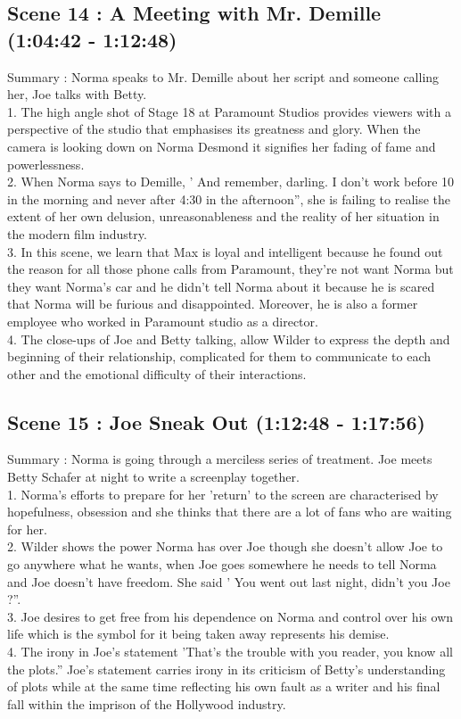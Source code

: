 \documentclass[a4paper]{article}
\begin{document}
\subsection{Scene 14 : A Meeting with Mr. Demille (1:04:42 - 1:12:48)}
Summary : Norma speaks to Mr. Demille about her script and someone calling her, Joe talks
with Betty.\\
1. The high angle shot of Stage 18 at Paramount Studios provides viewers with a
perspective of the studio that emphasises its greatness and glory. When the camera
is looking down on Norma Desmond it signifies her fading of fame and
powerlessness.\\
2. When Norma says to Demille, ' And remember, darling. I don’t work before 10 in the
morning and never after 4:30 in the afternoon”, she is failing to realise the extent of
her own delusion, unreasonableness and the reality of her situation in the modern
film industry.\\
3. In this scene, we learn that Max is loyal and intelligent because he found out the
reason for all those phone calls from Paramount, they’re not want Norma but they
want Norma’s car and he didn’t tell Norma about it because he is scared that Norma
will be furious and disappointed. Moreover, he is also a former employee who worked
in Paramount studio as a director.\\
4. The close-ups of Joe and Betty talking, allow Wilder to express the depth and
beginning of their relationship, complicated for them to communicate to each other
and the emotional difficulty of their interactions.\\

\subsection{Scene 15 : Joe Sneak Out (1:12:48 - 1:17:56)}
Summary : Norma is going through a merciless series of treatment. Joe meets Betty
Schafer at night to write a screenplay together.\\
1. Norma's efforts to prepare for her 'return' to the screen are characterised by
hopefulness, obsession and she thinks that there are a lot of fans who are waiting for
her.\\
2. Wilder shows the power Norma has over Joe though she doesn’t allow Joe to go
anywhere what he wants, when Joe goes somewhere he needs to tell Norma and
Joe doesn’t have freedom. She said ' You went out last night, didn’t you Joe ?”.\\
3. Joe desires to get free from his dependence on Norma and control over his own life
which is the symbol for it being taken away represents his demise.\\
4. The irony in Joe’s statement 'That’s the trouble with you reader, you know all the
plots.” Joe's statement carries irony in its criticism of Betty's understanding of plots
while at the same time reflecting his own fault as a writer and his final fall within the
imprison of the Hollywood industry.\\
\end{document}
